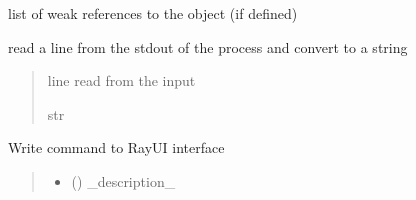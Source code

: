 \documentclass[letterpaper,10pt,english]{sphinxmanual}
\begin{document}
\begin{fulllineitems}

\begin{fulllineitems}
\label{\detokenize{index:raypyng.runner.RayUIRunner.__weakref__}}
\pysigstartsignatures
{}
\pysigstopsignatures
\sphinxAtStartPar
list of weak references to the object (if defined)

\end{fulllineitems}


\begin{fulllineitems}
\label{\detokenize{index:raypyng.runner.RayUIRunner._readline}}
\pysigstartsignatures
{}
\pysigstopsignatures
\sphinxAtStartPar
read a line from the stdout of the process and convert to a string
\begin{quote}\begin{description}
\sphinxAtStartPar
line read from the input

\sphinxAtStartPar
str

\end{description}\end{quote}

\end{fulllineitems}


\begin{fulllineitems}
\label{\detokenize{index:raypyng.runner.RayUIRunner._write}}
\pysigstartsignatures
{}
\pysigstopsignatures
\sphinxAtStartPar
Write command to RayUI interface
\begin{quote}\begin{description}
\begin{itemize}
\item {} 
\sphinxAtStartPar
{} () \textendash{} \_description\_


\end{itemize}
\end{description}
\end{quote}
\end{fulllineitems}
\end{fulllineitems}
\end{document}
